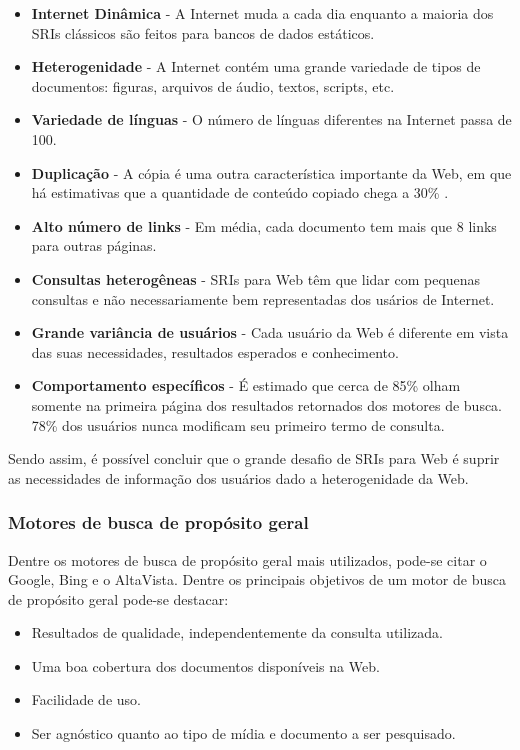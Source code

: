 \begin{itemize}
	\item \textbf{Internet Dinâmica} - A Internet muda a cada dia enquanto a maioria dos SRIs clássicos são feitos para bancos de dados estáticos.
	\item \textbf{Heterogenidade} - A Internet contém uma grande variedade de tipos de documentos: figuras, arquivos de áudio, textos, scripts, etc.
	\item \textbf{Variedade de línguas} - O número de línguas diferentes na Internet passa de 100.
	\item \textbf{Duplicação} - A cópia é uma outra característica importante da Web, em que há estimativas que a quantidade de conteúdo copiado chega a 30\% \cite{surveyir}.
	\item \textbf{Alto número de links} - Em média, cada documento tem mais que 8 links para outras páginas.
	\item \textbf{Consultas heterogêneas} - SRIs para Web têm que lidar com pequenas consultas e não necessariamente bem representadas dos usários de Internet.
	\item \textbf{Grande variância de usuários} - Cada usuário da Web é diferente em vista das suas necessidades, resultados esperados e conhecimento.
	\item \textbf{Comportamento específicos} - É estimado que cerca de 85\% olham somente na primeira página dos resultados retornados dos motores de busca. 78\% dos usuários nunca modificam seu primeiro termo de consulta.
\end{itemize}

Sendo assim, é possível concluir que o grande desafio de SRIs para Web é suprir as necessidades de informação dos usuários dado a heterogenidade da Web.

\subsubsection{Motores de busca de propósito geral}

Dentre os motores de busca de propósito geral mais utilizados, pode-se citar o Google, Bing e o AltaVista. Dentre os principais objetivos de um motor de busca de propósito geral pode-se destacar: 

\begin{itemize}
	\item Resultados de qualidade, independentemente da consulta utilizada.
	\item Uma boa cobertura dos documentos disponíveis na Web.
	\item Facilidade de uso.
	\item Ser agnóstico quanto ao tipo de mídia e documento a ser pesquisado.
\end{itemize}

